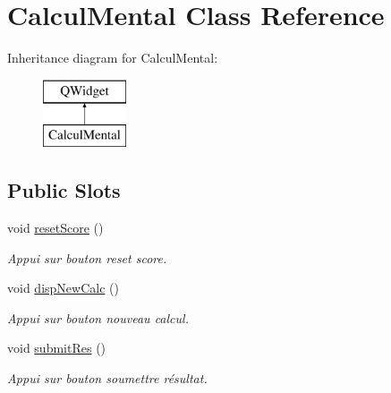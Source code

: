 \hypertarget{class_calcul_mental}{}\section{Calcul\+Mental Class Reference}
\label{class_calcul_mental}
Inheritance diagram for Calcul\+Mental\+:\begin{figure}[H]
\begin{center}
\leavevmode
\includegraphics[height=2.000000cm]{class_calcul_mental}
\end{center}
\end{figure}
\subsection*{Public Slots}
\begin{DoxyCompactItemize}
\item 
\mbox{\label{class_calcul_mental_a4f5f4f6818eaa9968900e94ea2ddbd87}} 
void \hyperlink{class_calcul_mental_a4f5f4f6818eaa9968900e94ea2ddbd87}{reset\+Score} ()
\begin{DoxyCompactList}\small\item\em Appui sur bouton reset score. \end{DoxyCompactList}\item 
\mbox{\label{class_calcul_mental_aec1aa48cc17bdce965ea7d9aed0044ef}} 
void \hyperlink{class_calcul_mental_aec1aa48cc17bdce965ea7d9aed0044ef}{disp\+New\+Calc} ()
\begin{DoxyCompactList}\small\item\em Appui sur bouton nouveau calcul. \end{DoxyCompactList}\item 
void \hyperlink{class_calcul_mental_ae74ebe9d8a7f8581ab2958a7987b7d5d}{submit\+Res} ()
\begin{DoxyCompactList}\small\item\em Appui sur bouton soumettre résultat. \end{DoxyCompactList}\end{DoxyCompactItemize}

